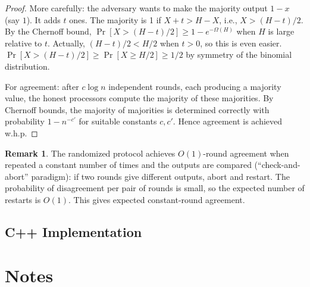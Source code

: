 \documentclass[twoside,12pt]{book}
\theoremstyle{plain}
\theoremstyle{definition}
\newtheorem{remark}[theorem]{Remark}
\theoremstyle{remark}
\begin{document}
\begin{proof}
More carefully: the adversary wants to make the majority output $1-x$ (say $1$). It adds $t$ ones. The majority is 1 if $X + t > H - X$, i.e., $X > (H - t)/2$. By the Chernoff bound, $\Pr[X > (H-t)/2] \geq 1 - e^{-\Omega(H)}$ when $H$ is large relative to $t$. Actually, $(H-t)/2 < H/2$ when $t > 0$, so this is even easier. $\Pr[X > (H-t)/2] \geq \Pr[X \geq H/2] \geq 1/2$ by symmetry of the binomial distribution.

For agreement: after $c \log n$ independent rounds, each producing a majority value, the honest processors compute the majority of these majorities. By Chernoff bounds, the majority of majorities is determined correctly with probability $1 - n^{-c'}$ for suitable constants $c, c'$. Hence agreement is achieved w.h.p.
\end{proof}

\begin{remark}
The randomized protocol achieves $O(1)$-round agreement when repeated a constant number of times and the outputs are compared (``check-and-abort'' paradigm): if two rounds give different outputs, abort and restart. The probability of disagreement per pair of rounds is small, so the expected number of restarts is $O(1)$. This gives expected constant-round agreement.
\end{remark}


\subsection*{C++ Implementation}







\section*{Notes}
\label{sec:parallel-notes}
\end{document}
